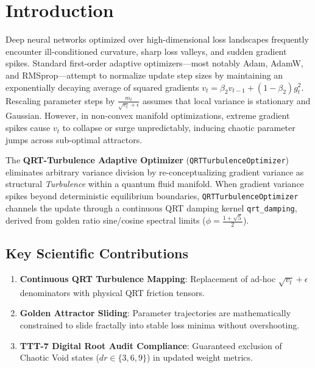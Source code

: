 \section{Introduction}
Deep neural networks optimized over high-dimensional loss landscapes frequently encounter ill-conditioned curvature, sharp loss valleys, and sudden gradient spikes. Standard first-order adaptive optimizers—most notably Adam, AdamW, and RMSprop—attempt to normalize update step sizes by maintaining an exponentially decaying average of squared gradients $v_t = \beta_2 v_{t-1} + (1 - \beta_2) g_t^2$. Rescaling parameter steps by $\frac{m_t}{\sqrt{v_t} + \epsilon}$ assumes that local variance is stationary and Gaussian. However, in non-convex manifold optimizations, extreme gradient spikes cause $v_t$ to collapse or surge unpredictably, inducing chaotic parameter jumps across sub-optimal attractors.

The \textbf{QRT-Turbulence Adaptive Optimizer} (\texttt{QRTTurbulenceOptimizer}) eliminates arbitrary variance division by re-conceptualizing gradient variance as structural \textit{Turbulence} within a quantum fluid manifold. When gradient variance spikes beyond deterministic equilibrium boundaries, \texttt{QRTTurbulenceOptimizer} channels the update through a continuous QRT damping kernel \texttt{qrt\_damping}, derived from golden ratio sine/cosine spectral limits ($\phi = \frac{1+\sqrt{5}}{2}$).

\subsection{Key Scientific Contributions}
\begin{enumerate}[label=\textbf{\arabic*.}]
    \item \textbf{Continuous QRT Turbulence Mapping}: Replacement of ad-hoc $\sqrt{v_t} + \epsilon$ denominators with physical QRT friction tensors.
    \item \textbf{Golden Attractor Sliding}: Parameter trajectories are mathematically constrained to slide fractally into stable loss minima without overshooting.
    \item \textbf{TTT-7 Digital Root Audit Compliance}: Guaranteed exclusion of Chaotic Void states ($dr \in \{3, 6, 9\}$) in updated weight metrics.
\end{enumerate}

